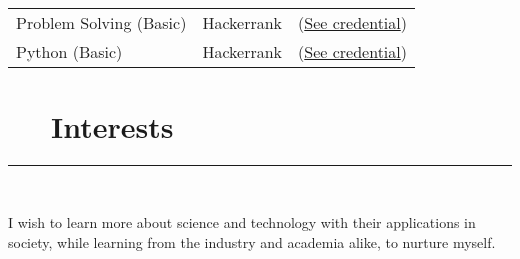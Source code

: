 \documentclass{article}
\begin{document}
\
\newline
\

\begin{tabular}{l l l}

    Problem Solving (Basic) & Hackerrank 
                            & (\href{https://www.hackerrank.com/certificates/8d1db5b492de}{See credential}) \\
    Python (Basic)  & Hackerrank 
                    & (\href{https://www.hackerrank.com/certificates/46699d054d5a}{See credential}) \\ 
\end{tabular}

\section*{\faHeartO ~~ Interests} 
\hrule

\
\newline
\

\noindent I wish to learn more about science and technology with their applications in society, while learning from the industry and academia alike, to nurture myself.
\end{document}
